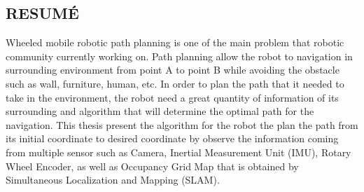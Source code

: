 \begin{center}
	\section*{RESUM\'E}
\end{center}
\hspace{1.27cm}
Wheeled mobile robotic path planning is one of the main problem that robotic community currently working on. Path planning allow the robot to navigation in surrounding environment from point A to point B while avoiding the obstacle such as wall, furniture, human, etc. In order to plan the path that it needed to take in the environment, the robot need a great quantity of information of its surrounding and algorithm that will determine the optimal path for the navigation. This thesis present the algorithm for the robot the plan the path from its initial coordinate to desired coordinate by observe the information coming from multiple sensor such as Camera, Inertial Measurement Unit (IMU), Rotary Wheel Encoder, as well as Occupancy Grid Map that is obtained by Simultaneous Localization and Mapping (SLAM).\par